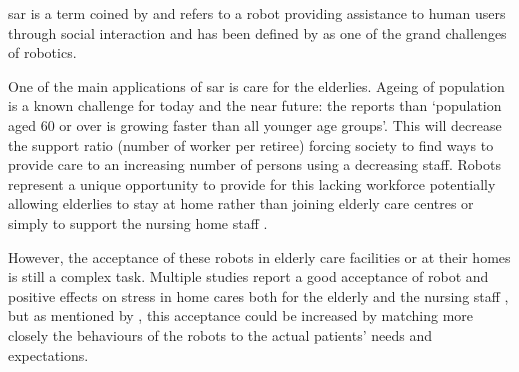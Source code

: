 	\gls{sar} is a term coined by \cite{feil2005defining} and refers to a robot providing assistance to human users through social interaction and has been defined by \cite{tapus2007socially} as one of the grand challenges of robotics.
	
	One of the main applications of \gls{sar} is care for the elderlies. Ageing of population is a known challenge for today and the near future: the \cite{united2017world} reports than `population aged 60 or over is growing faster than all younger age groups'. This will decrease the support ratio (number of worker per retiree) forcing society to find ways to provide care to an increasing number of persons using a decreasing staff. Robots represent a unique opportunity to provide for this lacking workforce potentially allowing elderlies to stay at home rather than joining elderly care centres \citep{di2014web} or simply to support the nursing home staff \citep{wada2004effects}.
	
	
    However, the acceptance of these robots in elderly care facilities or at their homes is still a complex task. Multiple studies report a good acceptance of robot and positive effects on stress in home cares both for the elderly and the nursing staff \citep{wada2004effects,tamura2004entertainment}, but as mentioned by \citet{broadbent2009acceptance}, this acceptance could be increased by matching more closely the behaviours of the robots to the actual patients' needs and expectations.
		
